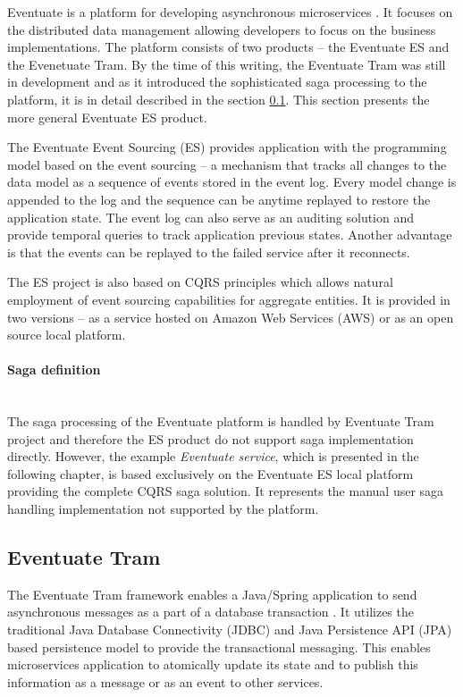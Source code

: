 \documentclass[oneside,
  digital, %
  table,   %
  lof,     %
  lot,     %
]{fithesis3}
\newcommand{\newlinepar}[1]{\paragraph{#1}\needspace{4\baselineskip}\mbox{}\\}
\begin{document}
Eventuate is a platform for developing asynchronous microservices \cite{eventuate.io}. It focuses on the distributed data management allowing developers to focus on the business implementations. The platform consists of two products -- the Eventuate ES and the Evenetuate Tram. By the time of this writing, the Eventuate Tram was still in development and as it introduced the sophisticated saga processing to the platform, it is in detail described in the section \ref{sec:eventuate-tram}. This section presents the more general Eventuate ES product.

The Eventuate Event Sourcing (ES) provides application with the programming model based on the event sourcing -- a mechanism that tracks all changes to the data model as a sequence of events stored in the event log. Every model change is appended to the log and the sequence can be anytime replayed to restore the application state. The event log can also serve as an auditing solution and provide temporal queries to track application previous states. Another advantage is that the events can be replayed to the failed service after it reconnects.


The ES project is also based on CQRS principles which allows natural employment of event sourcing capabilities for aggregate entities. It is provided in two versions -- as a service hosted on Amazon Web Services (AWS) or as an open source local platform.

\newlinepar{Saga definition}

The saga processing of the Eventuate platform is handled by Eventuate Tram project and therefore the ES product do not support saga implementation directly. However, the example \textit{Eventuate service}, which is presented in the following chapter, is based exclusively on the Eventuate ES local platform providing the complete CQRS saga solution. It represents the manual user saga handling implementation not supported by the platform. 

\subsection{Eventuate Tram}
\label{sec:eventuate-tram}

The Eventuate Tram framework enables a Java/Spring application to send asynchronous messages as a part of a database transaction \cite{eventuate-tram}. It utilizes the traditional Java Database Connectivity (JDBC) and Java Persistence API (JPA) based persistence model to provide the transactional messaging. This enables microservices application to atomically update its state and to publish this information as a message or as an event to other services.
\end{document}
